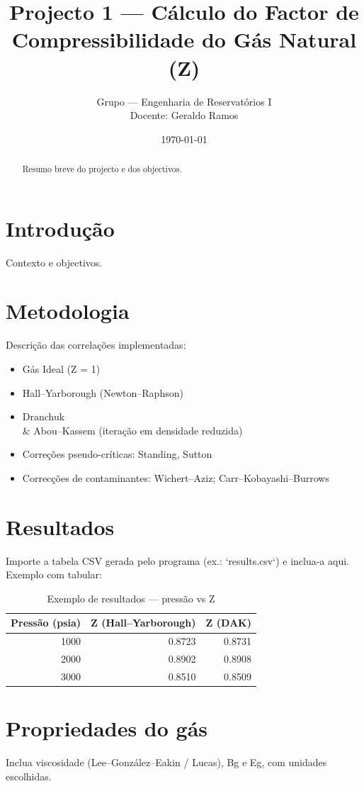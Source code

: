 \documentclass[11pt,a4paper]{article}
\title{Projecto 1 — Cálculo do Factor de Compressibilidade do Gás Natural (Z)}
\author{Grupo — Engenharia de Reservatórios I \\\small{Docente: Geraldo Ramos}}
\date{\today}
\begin{document}
\maketitle
\begin{abstract}
Resumo breve do projecto e dos objectivos.
\end{abstract}

\section{Introdução}
Contexto e objectivos.

\section{Metodologia}
Descrição das correlações implementadas:
\begin{itemize}
  \item Gás Ideal (Z = 1)
  \item Hall--Yarborough (Newton--Raphson)
  \item Dranchuk \\& Abou--Kassem (iteração em densidade reduzida)
  \item Correções pseudo-críticas: Standing, Sutton
  \item Correcções de contaminantes: Wichert--Aziz; Carr--Kobayashi--Burrows
\end{itemize}

\section{Resultados}
Importe a tabela CSV gerada pelo programa (ex.: `results.csv`) e inclua-a aqui. Exemplo com tabular:

\begin{table}[ht]
\centering
\caption{Exemplo de resultados — pressão vs Z}
\begin{tabular}{r r r}
\toprule
Pressão (psia) & Z (Hall--Yarborough) & Z (DAK) \\
\midrule
1000 & 0.8723 & 0.8731 \\
2000 & 0.8902 & 0.8908 \\
3000 & 0.8510 & 0.8509 \\
\bottomrule
\end{tabular}
\end{table}

\section{Propriedades do gás}
Inclua viscosidade (Lee--González--Eakin / Lucas), Bg e Eg, com unidades escolhidas.
\end{document}
